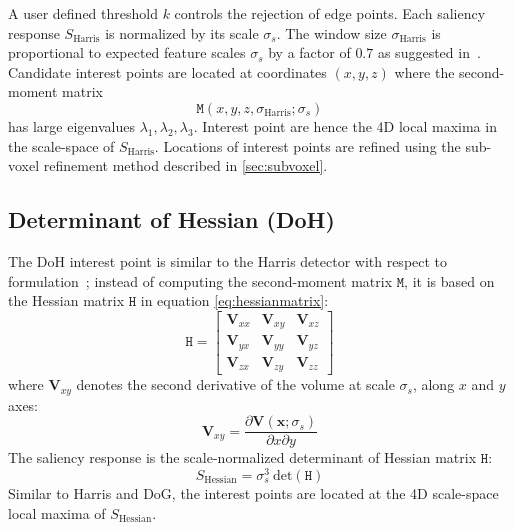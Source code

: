A user defined threshold $k$ controls the rejection of edge points.
Each saliency response $S_\textrm{Harris}$ is normalized by its scale $\sigma_s$. The window size $\sigma_\textrm{Harris}$ is proportional to expected feature scales $\sigma_s$ by a factor of $0.7$ as suggested in~\cite{Mikolajczyk2004}. 
Candidate interest points are located at coordinates $(x,y,z)$ where the second-moment matrix 
\begin{equation}
\mathtt{M}(x,y,z,\sigma_\textrm{Harris};\sigma_s)
\end{equation} 
has large eigenvalues $\lambda_1, \lambda_2, \lambda_3$. Interest point are hence the 4D local maxima in the scale-space of $S_{\textrm{Harris}}$. Locations of interest points are refined using the sub-voxel refinement method described in \ref{sec:subvoxel}.

\subsection{Determinant of Hessian (DoH)}
\label{sec:doh}
The DoH interest point is similar to the Harris detector with respect to formulation~\cite{Lindeberg1998}; instead of computing the second-moment matrix $\mathtt{M}$, it is based on the Hessian matrix $\mathtt{H}$ in equation \ref{eq:hessianmatrix}:
\begin{equation}
\mathtt{H} = 
\left[
\begin{array}{ccc}
\mathbf{V}_{xx} & \mathbf{V}_{xy} & \mathbf{V}_{xz} \\
\mathbf{V}_{yx} & \mathbf{V}_{yy} & \mathbf{V}_{yz} \\
\mathbf{V}_{zx} & \mathbf{V}_{zy} & \mathbf{V}_{zz} 
\end{array}
\right]
\label{eq:hessianmatrix}
\end{equation}
where $\mathbf{V}_{xy}$ denotes the second derivative of the volume at scale $\sigma_s$, along $x$ and $y$ axes: 
\begin{equation}
\mathbf{V}_{xy} = \frac{\partial \mathbf{V}(\mathbf{x};\sigma_s)}{\partial x \partial y}
\label{eq:hessiandiverative}
\end{equation}
The saliency response is the scale-normalized determinant of Hessian matrix $\mathtt{H}$:
\begin{equation}
S_{\textrm{Hessian}} = \sigma^3_s \:\mathrm{det}(\mathtt{H})
\label{eq:hessiansaliency}
\end{equation}
Similar to Harris and DoG, the interest points are located at the 4D scale-space local maxima of $S_\textrm{Hessian}$.

